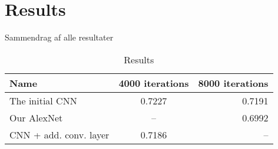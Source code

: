 \graphicspath{{Chapters/Project/}}

\section{Results} %
\label{sec:results}

Sammendrag af alle resultater

\vspace{3 mm} %
\begin{table}[H]
\centering
\sffamily
\small
\begin{tabular}{l | c r}
\toprule
Name 					& 4000 iterations		& 8000 iterations	\\
\midrule 
The initial CNN 		& 0.7227				& 0.7191			\\ 
Our AlexNet 			& -- 					& 0.6992	 		\\ 
CNN + add. conv. layer	& 0.7186				& --				\\ 
\bottomrule 
\end{tabular}
\caption[Short caption]{Results}
\label{table:table_results}
\end{table}

